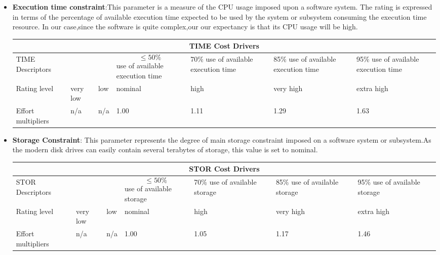 \begin{itemize}
\item \textbf{Execution time constraint}:This parameter is a measure of the CPU usage imposed upon a software system. The rating is expressed in terms of the percentage of available execution time expected to be used by the system or subsystem consuming the execution time resource. In our case,since the software is quite complex,our our expectancy is that its CPU usage will be high.

\begin{longtable}{| m{}| m{} | m{} | m{} | m{} | m{} | m{}| }
\hline
\multicolumn{7}{c}{TIME Cost Drivers}\\
\hline
\hline
TIME Descriptors &  &  & \begin{equation*}
{\le 50\%} 
\end{equation*} use of available execution time & 70\% use of available execution time & 85\% use of available execution time & 95\% use of available execution time \\
\hline
Rating level & very low & low & nominal & high & very high & extra high \\
\hline
Effort multipliers & n/a & n/a & 1.00 & 1.11 & 1.29 & 1.63 \\
\hline
\end{longtable}

\item \textbf{Storage Constraint}: This parameter represents the degree of main storage constraint imposed on a software system or subsystem.As the modern disk drives can easily contain several terabytes of storage, this value is set to nominal.

\begin{longtable}{| m{}| m{} | m{} | m{} | m{} | m{} | m{}| }
\hline
\multicolumn{7}{c}{STOR Cost Drivers}\\
\hline
\hline
STOR Descriptors &  &  & \begin{equation*}
{\le 50\%} 
\end{equation*} use of available storage& 70\% use of available storage & 85\% use of available storage & 95\% use of available storage \\
\hline
Rating level & very low & low & nominal & high & very high & extra high \\
\hline
Effort multipliers & n/a & n/a & 1.00 & 1.05 & 1.17 & 1.46 \\
\hline
\end{longtable}


\end{itemize}
